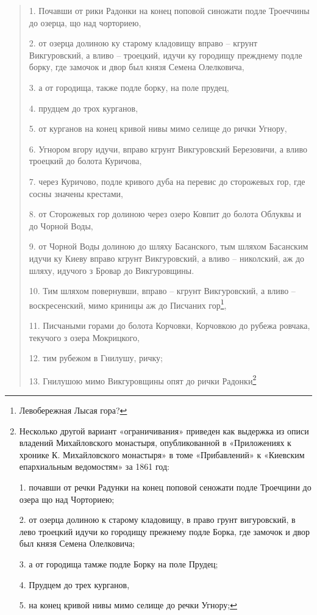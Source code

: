 \begin{quotation}
1. Почавши от рики Радонки на конец поповой синожати подле Троеччины до озерца, що над чорториею,

2. от озерца долиною ку старому кладовищу вправо – кгрунт Викгуровский, а вливо – троецкий, идучи ку городищу прежднему подле борку, где замочок и двор был князя Семена Олелковича,

3. а от городища, также подле борку, на поле прудец, 

4. прудцем до трох курганов, 

5. от курганов на конец кривой нивы мимо селище до рички Угнору,

6. Угнором вгору идучи, вправо кгрунт Викгуровский Березовичи, а вливо троецкий до болота Куричова,

7. через Куричово, подле кривого дуба на перевис до сторожевых гор, где сосны значены крестами, 

8. от Сторожевых гор долиною через озеро Ковпит до болота Облуквы и до Чорной Воды, 

9. от Чорной Воды долиною до шляху Басанского, тым шляхом Басанским идучи ку Киеву вправо кгрунт Викгуровский, а вливо – николский, аж до шляху, идучого з Бровар до Викгуровщины. 

10. Тим шляхом повернувши, вправо – кгрунт Викгуровский, а вливо – воскресенский, мимо криницы аж до Писчаних гор\footnote{Левобережная Лысая гора?},

11. Писчаными горами до болота Корчовки, Корчовкою до рубежа ровчака, текучого з озера Мокрицкого,

12. тим рубежом в Гнилушу, ричку; 

13. Гнилушою мимо Викгуровщины опят до рички Радонки\footnote{Несколько другой вариант «ограничивания» приведен как выдержка из описи владений Михайловского монастыря, опубликованной в «Приложениях к хронике К. Михайловского монастыря» в томе «Прибавлений» к «Киевским епархиальным ведомостям» за 1861 год:

1. почавши от речки Радунки на конец поповой сеножати подле Троечцини до озера що над Чорториею;

2. от озерца долиною к старому кладовищу, в право грунт вигуровский, в лево троецкий идучи ко городищу прежнему подле Борка, где замочок и двор был князя Семена Олелковича; 

3. а от городища тамже подле Борку на поле Прудец; 

4. Прудцем до трех курганов,

5. на конец кривой нивы мимо селище до речки Угнору;

}
\end{quotation}
